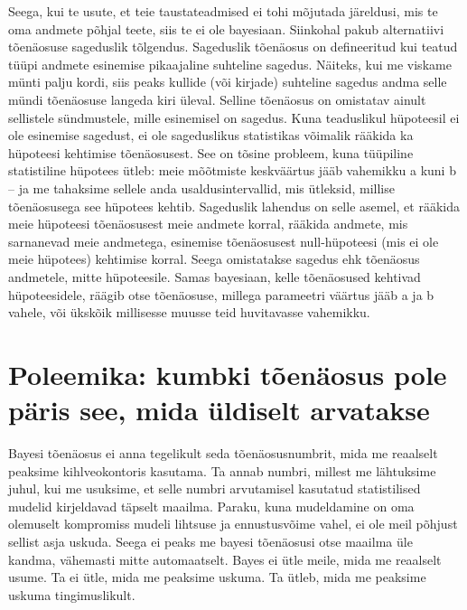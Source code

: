 \documentclass[]{book}
\begin{document}
Seega, kui te usute, et teie taustateadmised ei tohi mõjutada järeldusi, mis te oma andmete põhjal teete, siis te ei ole bayesiaan.
Siinkohal pakub alternatiivi tõenäosuse sageduslik tõlgendus.
Sageduslik tõenäosus on defineeritud kui teatud tüüpi andmete esinemise pikaajaline suhteline sagedus.
Näiteks, kui me viskame münti palju kordi, siis peaks kullide (või kirjade) suhteline sagedus andma selle mündi tõenäosuse langeda kiri üleval.
Selline tõenäosus on omistatav ainult sellistele sündmustele, mille esinemisel on sagedus.
Kuna teaduslikul hüpoteesil ei ole esinemise sagedust, ei ole sageduslikus statistikas võimalik rääkida ka hüpoteesi kehtimise tõenäosusest. See on tõsine probleem, kuna tüüpiline statistiline hüpotees ütleb: meie mõõtmiste keskväärtus jääb vahemikku a kuni b -- ja me tahaksime sellele anda usaldusintervallid, mis ütleksid, millise tõenäosusega see hüpotees kehtib.
Sageduslik lahendus on selle asemel, et rääkida meie hüpoteesi tõenäosusest meie andmete korral, rääkida andmete, mis sarnanevad meie andmetega, esinemise tõenäosusest null-hüpoteesi (mis ei ole meie hüpotees) kehtimise korral.
Seega omistatakse sagedus ehk tõenäosus andmetele, mitte hüpoteesile.
Samas bayesiaan, kelle tõenäosused kehtivad hüpoteesidele, räägib otse tõenäosuse, millega parameetri väärtus jääb a ja b vahele, või ükskõik millisesse muusse teid huvitavasse vahemikku.

\hypertarget{poleemika-kumbki-toenaosus-pole-paris-see-mida-uldiselt-arvatakse-1}{%
\section*{Poleemika: kumbki tõenäosus pole päris see, mida üldiselt arvatakse}\label{poleemika-kumbki-toenaosus-pole-paris-see-mida-uldiselt-arvatakse-1}}

Bayesi tõenäosus ei anna tegelikult seda tõenäosusnumbrit, mida me reaalselt peaksime kihlveokontoris kasutama.
Ta annab numbri, millest me lähtuksime juhul, kui me usuksime, et selle numbri arvutamisel kasutatud statistilised mudelid kirjeldavad täpselt maailma.
Paraku, kuna mudeldamine on oma olemuselt kompromiss mudeli lihtsuse ja ennustusvõime vahel, ei ole meil põhjust sellist asja uskuda.
Seega ei peaks me bayesi tõenäosusi otse maailma üle kandma, vähemasti mitte automaatselt.
Bayes ei ütle meile, mida me reaalselt usume.
Ta ei ütle, mida me peaksime uskuma. Ta ütleb, mida me peaksime uskuma tingimuslikult.
\end{document}
